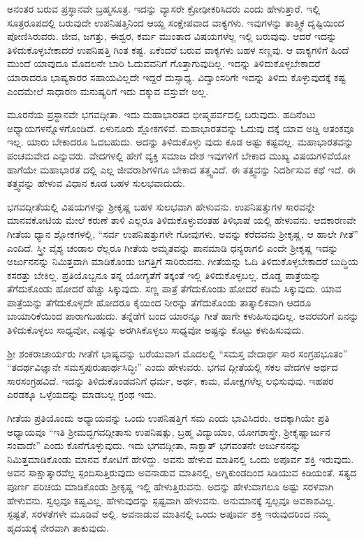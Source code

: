 ಅನಂತರ ಬರುವ ಪ್ರಸ್ಥಾನವೇ ಬ್ರಹ್ಮಸೂತ್ರ. ಇದನ್ನು ವ್ಯಾಸರೇ ಕ್ರೋಢೀಕರಿಸಿದರು ಎಂದು ಹೇಳುತ್ತಾರೆ. ಇಲ್ಲಿ ಸೂತ್ರರೂಪದಲ್ಲಿ ಬರುವುದೇ ಉಪನಿಷತ್ತಿನಿಂದ ಆಯ್ದ ಸಂಕ್ಷೇಪವಾದ ವಾಕ್ಯಗಳು. ಇವುಗಳನ್ನು ತಾತ್ತ್ವಿಕ ದೃಷ್ಟಿಯಿಂದ ಪೋಣಿಸಿರುವರು. ಜೀವ, ಜಗತ್ತು, ಈಶ್ವರ, ಕರ್ಮ ಮುಂತಾದ ವಿಷಯಗಳೆಲ್ಲ ಇಲ್ಲಿ ಬರುವುವು. ಆದರೆ ಇದನ್ನು ತಿಳಿದುಕೊಳ್ಳಬೇಕಾದರೆ ಉಪನಿಷತ್ತಿ ಗಿಂತ ಕಷ್ಟ. ಏಕೆಂದರೆ ಬರುವ ವಾಕ್ಯಗಳು ಬಹಳ ಸಣ್ಣವು. ಆ ವಾಕ್ಯಗಳಿಗೆ ಹಿಂದೆ ಮುಂದೆ ಯಾವುದೂ ಮೊದಲನೇ ಬಾರಿ ಓದುವವನಿಗೆ ಗೊತ್ತಾಗುವುದಿಲ್ಲ. ಇದನ್ನು ತಿಳಿದುಕೊಳ್ಳಬೇಕಾದರೆ ಯಾರಾದರೂ ಭಾಷ್ಯಕಾರರ ಸಹಾಯವಿಲ್ಲದೇ ಇದ್ದರೆ ದುಸ್ಸಾಧ್ಯ. ವಿದ್ವಾಂಸರಿಗೇ ಇದನ್ನು ತಿಳಿದು ಕೊಳ್ಳುವುದಕ್ಕೆ ಕಷ್ಟ ಎಂದಮೇಲೆ ಸಾಧಾರಣ ಮನುಷ್ಯರಿಗೆ ಇದು ದಕ್ಕುವ ವಸ್ತುವೇ ಅಲ್ಲ.

ಮೂರನೆಯ ಪ್ರಸ್ಥಾನವೇ ಭಗವದ್ಗೀತಾ. ಇದು ಮಹಾಭಾರತದ ಭೀಷ್ಮಪರ್ವದಲ್ಲಿ ಬರುವುದು. ಹದಿನೆಂಟು ಅಧ್ಯಾಯಗಳನ್ನೊಳಗೊಂಡಿದೆ. ಏಳುನೂರು ಶ್ಲೋಕಗಳಿವೆ. ಮಹಾಭಾರತವನ್ನು ಓದುವು ದಕ್ಕೆ ಯಾವ ಅಡ್ಡಿ ಆತಂಕವೂ ಇಲ್ಲ. ಯಾರು ಬೇಕಾದರೂ ಓದಬಹುದು. ಅದನ್ನು ತಿಳಿದುಕೊಳ್ಳು ವುದು ಕೂಡ ಅಷ್ಟು ಕಷ್ಟವಲ್ಲ. ಮಹಾಭಾರತವನ್ನು ಪಂಚಮವೇದ ಎನ್ನುವರು. ವೇದಗಳಲ್ಲಿ ಹೇಗೆ ವ್ಯಕ್ತಿ ಸಮಾಜ ದೇಶ ಇವುಗಳಿಗೆ ಬೇಕಾದ ಮುಖ್ಯ ವಿಷಯಗಳಿವೆಯೋ ಹಾಗೆಯೇ ಮಹಾಭಾರತ ದಲ್ಲಿ ಎಲ್ಲ ಜೀವರಾಶಿಗಳಿಗೂ ಬೇಕಾದ ತತ್ತ್ವವಿದೆ. ಈ ತತ್ತ್ವವನ್ನು ನಿದರ್ಶಿಸುವ ಕಥೆ ಇದೆ. ಈ ತತ್ತ್ವವನ್ನು ಹೇಳುವ ವಿಧಾನ ಕೂಡ ಬಹಳ ಸುಲಭವಾದುದು.

ಭಗವದ್ಗೀತೆಯಲ್ಲಿ ವಿಷಯಗಳನ್ನು ಶ್ರೀಕೃಷ್ಣ ಬಹಳ ಸುಲಭವಾಗಿ ಹೇಳುವನು. ಉಪನಿಷತ್ತುಗಳ ಸಾರವನ್ನೇ ಮಾನವಕೋಟಿಯ ಮೇಲೆ ಕರುಣೆ ತಾಳಿ ಎಲ್ಲರೂ ತಿಳಿದುಕೊಳ್ಳುವಂತಹ ತಿಳಿಭಾಷೆ ಯಲ್ಲಿ ಹೇಳುವನು. ಆದಕಾರಣವೇ ಗೀತೆಯ ಧ್ಯಾನ ಶ್ಲೋಕಗಳಲ್ಲಿ, “ಸರ್ವ ಉಪನಿಷತ್ತುಗಳೇ ಗೋವುಗಳು, ಅವನ್ನು ಕರೆದವನು ಶ್ರೀಕೃಷ್ಣ, ಆ ಹಾಲೇ ಗೀತೆ” ಎಂದಿದೆ. ಸ್ತ್ರೀ ವೈಶ್ಯ ಚಂಡಾಲ ರೆಲ್ಲರೂ ಗೀತೆಯ ಅಮೃತವನ್ನು ಪಾನಮಾಡಿ ಧನ್ಯರಾಗಲಿ ಎಂದೇ ಶ್ರೀಕೃಷ್ಣ ಇದನ್ನು ಅರ್ಜುನನನ್ನು ನಿಮಿತ್ತವಾಗಿ ಮಾಡಿಕೊಂಡು ಜಗತ್ತಿಗೆ ಸಾರಿರುವನು. ಗೀತೆಯನ್ನು ಓದಿ ತಿಳಿದುಕೊಳ್ಳಬೇಕಾದರೆ ಬುದ್ಧಿಯ ಕಸರತ್ತು ಬೇಕಿಲ್ಲ. ಪ್ರತಿಯೊಬ್ಬನೂ ತನ್ನ ಯೋಗ್ಯತೆಗೆ ತಕ್ಕಂತೆ ಇಲ್ಲಿ ತಿಳಿದುಕೊಳ್ಳಬಲ್ಲ. ದೊಡ್ಡ ಪಾತ್ರೆಯನ್ನು ತೆಗೆದುಕೊಂಡು ಹೋದರೆ ಹೆಚ್ಚು ಸಿಕ್ಕುವುದು. ಸಣ್ಣ ಪಾತ್ರೆ ತೆಗೆದುಕೊಂಡು ಹೋದರೆ ಕಡಿಮೆ ಸಿಕ್ಕುವುದು. ಯಾವ ಪಾತ್ರೆಯನ್ನು ತೆಗೆದುಕೊಳ್ಳದೇ ಹೋದರೂ ಕೈಯಿಂದ ನೀರನ್ನು ತೆಗೆದುಕೊಂಡು ತಾತ್ಕಾಲಿಕವಾಗಿ ಆದರೂ ಬಾಯಾರಿಕೆಯಿಂದ ಪಾರಾಗಬಹುದು. ತನ್ನೆಡೆಗೆ ಬಂದ ಯಾರನ್ನೂ ಗೀತೆ ಹಾಗೇ ಕಳುಹಿಸುವುದಿಲ್ಲ. ಅವರವರಿಗೆ ಏನನ್ನು ತಿಳಿದುಕೊಳ್ಳಲು ಸಾಧ್ಯವೋ, ಎಷ್ಟನ್ನು ಅರಗಿಸಿಕೊಳ್ಳಲು ಸಾಧ್ಯವೋ ಅಷ್ಟನ್ನು ಕೊಟ್ಟು ಕಳುಹಿಸುವುದು.

ಶ್ರೀ ಶಂಕರಾಚಾರ್ಯರು ಗೀತೆಗೆ ಭಾಷ್ಯವನ್ನು ಬರೆಯುವಾಗ ಮೊದಲಲ್ಲಿ “ಸಮಸ್ತ ವೇದಾರ್ಥ ಸಾರ ಸಂಗ್ರಹಭೂತಂ” “ತದರ್ಥವಿಜ್ಞಾನೇ ಸಮಸ್ತಪುರುಷಾರ್ಥಸಿದ್ಧಿಃ” ಎಂದು ಹೇಳುವರು. ಭಗವ ದ್ಗೀತೆಯಲ್ಲಿ ಸಕಲ ವೇದಗಳ ಅರ್ಥದ ಸಾರಸಂಗ್ರಹವಿದೆ. ಇದನ್ನು ತಿಳಿದುಕೊಂಡವನಿಗೆ ಧರ್ಮ, ಅರ್ಥ, ಕಾಮ, ಮೋಕ್ಷಗಳೆಲ್ಲ ಲಭಿಸುವುವು. ಇಹಪರ ಎರಡಕ್ಕೂ ಒಳ್ಳೆಯದನ್ನು ಮಾಡಬಲ್ಲ ಗ್ರಂಥ ಇದು.

ಗೀತೆಯ ಪ್ರತಿಯೊಂದು ಅಧ್ಯಾಯವನ್ನು ಒಂದು ಉಪನಿಷತ್ತಿಗೆ ಸಮ ಎಂದು ಭಾವಿಸಿದರು. ಅದಕ್ಕಾಗಿಯೇ ಪ್ರತಿ ಅಧ್ಯಾಯವೂ “ಇತಿ ಶ್ರೀಮದ್ಭಗವದ್ಗೀತಾಸು ಉಪನಿಷತ್ಸು, ಬ್ರಹ್ಮ ವಿದ್ಯಾಯಾಂ, ಯೋಗಶಾಸ್ತ್ರೇ, ಶ್ರೀಕೃಷ್ಣಾರ್ಜುನ ಸಂವಾದೇ” ಎಂದು ಕೊನೆಗೊಳ್ಳುವುದು. ಇದು ಭಗವದ್ಗೀತಾ, ಸಾಕ್ಷಾತ್ ಭಗವಂತನೇ ಅರ್ಜುನನನ್ನು ನಿಮಿತ್ತಮಾಡಿಕೊಂಡು ಮಾನವ ಕೋಟಿಗೆ ಹೇಳಿದ್ದು. ಅವನು ಹೇಳುವ ಮಾತಿನಲ್ಲಿ ಒಂದು ಅಪೂರ್ವ ಶಕ್ತಿ ಇರುವುದು. ಅವನ ಸಾಕ್ಷಾತ್ಕಾರವೆಲ್ಲ ಸ್ಪಂದಿಸುತ್ತಿರುವುದು ಅವನಾಡುವ ಮಾತಿನಲ್ಲಿ, ಅಗ್ನಿಕುಂಡದಿಂದ ಸಿಡಿಯುವ ಕಿಡಿಯಂತೆ. ಸತ್ಯದ ಪೂರ್ಣ ಪರಿಚಯ ಮಾಡಿಕೊಂಡು ಶ್ರೀಕೃಷ್ಣ ಇಲ್ಲಿ ಹೇಳುತ್ತಿರುವನು. ಅದನ್ನು ಹೇಳುವಾಗಲೂ ಅಷ್ಟು ಸರಳವಾಗಿ ಹೇಳುವನು. ಸ್ವಲ್ಪವೂ ಕಷ್ವವಿಲ್ಲ. ಹೇಳುವುದನ್ನು ಸ್ಪಷ್ಟವಾಗಿ ಹೇಳುವನು. ಅನುಮಾನಕ್ಕೆ ಸ್ವಲ್ಪವೂ ಅವಕಾಶವಿಲ್ಲ. ಸ್ಪಷ್ಟತೆ, ಸರಳತೆಗಳೇ ಮೂಡಿವೆ ಅಲ್ಲಿ. ಅವನಾಡುವ ಮಾತಿನಲ್ಲಿ ಒಂದು ಅಪೂರ್ವ ಶಕ್ತಿ ಇರುವುದರಿಂದ ನಮ್ಮ ಹೃದಯಕ್ಕೆ ನೇರವಾಗಿ ತಾಕುವುದು.

